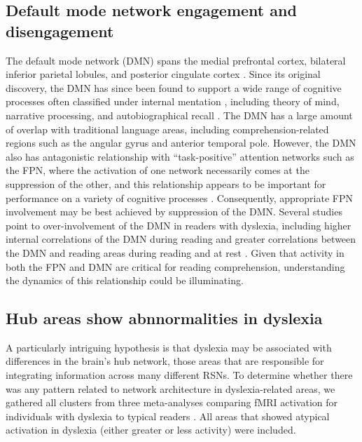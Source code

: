 \subsection{Default mode network engagement and disengagement} 
The default mode network (DMN) spans the medial prefrontal cortex, bilateral inferior parietal lobules, and posterior cingulate cortex \citep{Raichle2001}. Since its original discovery, the DMN has since been found to support a wide range of cognitive processes often classified under internal mentation \citep{Buckner2008}, including theory of mind, narrative processing, and autobiographical recall \citep{AbdulSabur2014}. The DMN has a large amount of overlap with traditional language areas, including comprehension-related regions such as the angular gyrus and anterior temporal pole. However, the DMN also has antagonistic relationship with ``task-positive'' attention networks such as the FPN, where the activation of one network necessarily comes at the suppression of the other, and this relationship appears to be important for performance on a variety of cognitive processes \citep{Fox2005, Keller2015}. Consequently, appropriate FPN involvement may be best achieved by suppression of the DMN. Several studies point to over-involvement of the DMN in readers with dyslexia, including higher internal correlations of the DMN during reading \citep{Finn2014} and greater correlations between the DMN and reading areas during reading and at rest \citep{Schurz2014}. Given that activity in both the FPN and DMN are critical for reading comprehension, understanding the dynamics of this relationship could be illuminating.

\subsection{Hub areas show abnnormalities in dyslexia}
A particularly intriguing hypothesis is that dyslexia may be associated with differences in the brain's hub network, those areas that are responsible for integrating information across many different RSNs. To determine whether there was any pattern related to network architecture in dyslexia-related areas, we gathered all clusters from three meta-analyses comparing fMRI activation for individuals with dyslexia to typical readers \citep{Maisog2008, Richlan2009, Paulesu2014}. All areas that showed atypical activation in dyslexia (either greater or less activity) were included.


